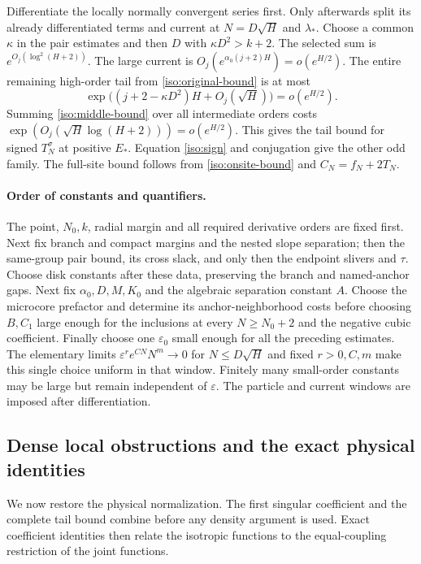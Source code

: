 \documentclass[11pt]{article}
\numberwithin{equation}{section}
\theoremstyle{definition}
\newcommand{\eps}{\varepsilon}
\begin{document}
Differentiate the locally normally convergent series first. Only
afterwards split its already differentiated terms and current at
$N=D\sqrt H$ and $\lambda_*$.
Choose a common $\kappa$ in the pair estimates and then
$D$ with $\kappa D^2>k+2$.
The selected sum is $e^{O_j(\log^2(H+2))}$.
The large current is $O_j(e^{\alpha_0(j+2)H})=o(e^{H/2})$.
The entire remaining high-order tail from \eqref{iso:original-bound}
is at most
\[
 \exp\bigl((j+2-\kappa D^2)H+O_j(\sqrt H)\bigr)=o(e^{H/2}).
\]
Summing \eqref{iso:middle-bound} over all intermediate orders costs
$\exp(O_j(\sqrt H\log(H+2)))=o(e^{H/2})$.
This gives the tail bound for signed $T_N^\sigma$ at positive $E_*$.
Equation \eqref{iso:sign} and conjugation give the other odd family.
The full-site bound follows from \eqref{iso:onsite-bound} and
$C_N=f_N+2T_N$.

\paragraph{Order of constants and quantifiers.}
The point, $N_0,k$, radial margin and all required derivative orders are
fixed first. Next fix branch and compact margins and the nested slope
separation; then the same-group pair bound, its cross slack, and only
then the endpoint slivers and $\tau$. Choose disk constants after these
data, preserving the branch and named-anchor gaps. Next fix
$\alpha_0,D,M,K_0$ and the algebraic separation constant $A$.
Choose the microcore prefactor and determine its anchor-neighborhood
costs before choosing $B,C_1$ large enough for the inclusions at every
$N\ge N_0+2$ and the negative cubic coefficient. Finally choose one
$\eps_0$ small enough for all the preceding estimates. The elementary
limits $\eps^r e^{CN}N^m\to0$ for $N\le D\sqrt H$ and fixed
$r>0,C,m$ make this single choice uniform in that window.
Finitely many small-order constants may be large but remain independent
of $\eps$. The particle and current windows are imposed after
differentiation.

\subsection{Dense local obstructions and the exact physical identities}

We now restore the physical normalization. The first singular
coefficient and the complete tail bound combine before any density
argument is used. Exact coefficient identities then relate the
isotropic functions to the equal-coupling restriction of the joint
functions.
\end{document}
